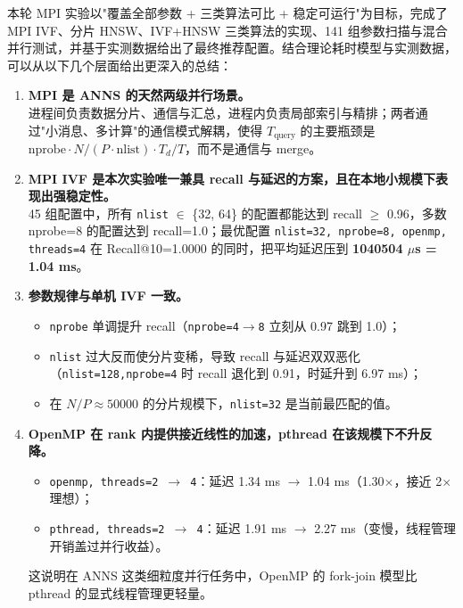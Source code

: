 \documentclass[a4paper]{article}
\begin{document}
本轮 MPI 实验以"覆盖全部参数 + 三类算法可比 + 稳定可运行"为目标，完成了 MPI IVF、分片 HNSW、IVF+HNSW 三类算法的实现、141 组参数扫描与混合并行测试，并基于实测数据给出了最终推荐配置。结合理论耗时模型与实测数据，可以从以下几个层面给出更深入的总结：

\begin{enumerate}
    \item \textbf{MPI 是 ANNS 的天然两级并行场景。}\\
    进程间负责数据分片、通信与汇总，进程内负责局部索引与精排；两者通过"小消息、多计算"的通信模式解耦，使得 $T_{\text{query}}$ 的主要瓶颈是 $\text{nprobe} \cdot N/(P \cdot \text{nlist}) \cdot T_d / T$，而不是通信与 merge。

    \item \textbf{MPI IVF 是本次实验唯一兼具 recall 与延迟的方案，且在本地小规模下表现出强稳定性。}\\
    45 组配置中，所有 \texttt{nlist} $\in$ \{32, 64\} 的配置都能达到 recall $\geq$ 0.96，多数 nprobe=8 的配置达到 recall=1.0；最优配置 \texttt{nlist=32, nprobe=8, openmp, threads=4} 在 Recall@10=1.0000 的同时，把平均延迟压到 \textbf{1040504 $\mu$s = 1.04 ms}。

    \item \textbf{参数规律与单机 IVF 一致。}
    \begin{itemize}
        \item \texttt{nprobe} 单调提升 recall（\texttt{nprobe=4$\rightarrow$8} 立刻从 0.97 跳到 1.0）；
        \item \texttt{nlist} 过大反而使分片变稀，导致 recall 与延迟双双恶化（\texttt{nlist=128,nprobe=4} 时 recall 退化到 0.91，时延升到 6.97 ms）；
        \item 在 $N/P \approx 50000$ 的分片规模下，\texttt{nlist=32} 是当前最匹配的值。
    \end{itemize}

    \item \textbf{OpenMP 在 rank 内提供接近线性的加速，pthread 在该规模下不升反降。}
    \begin{itemize}
        \item \texttt{openmp, threads=2 $\rightarrow$ 4}：延迟 1.34 ms $\rightarrow$ 1.04 ms（1.30$\times$，接近 2$\times$ 理想）；
        \item \texttt{pthread, threads=2 $\rightarrow$ 4}：延迟 1.91 ms $\rightarrow$ 2.27 ms（变慢，线程管理开销盖过并行收益）。
    \end{itemize}
    这说明在 ANNS 这类细粒度并行任务中，OpenMP 的 fork-join 模型比 pthread 的显式线程管理更轻量。


\end{enumerate}
\end{document}
